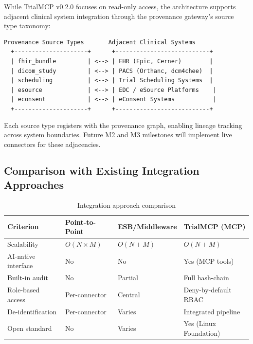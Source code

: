\documentclass[10pt,letterpaper]{article}
\begin{document}
While TrialMCP v0.2.0 focuses on read-only access, the architecture supports adjacent clinical system integration through the provenance gateway's source type taxonomy:

\begin{lstlisting}[title={\textbf{Clinical System Adjacency Model}}]
  Provenance Source Types       Adjacent Clinical Systems
  +---------------------+      +---------------------------+
  | fhir_bundle         | <--> | EHR (Epic, Cerner)        |
  | dicom_study         | <--> | PACS (Orthanc, dcm4chee)  |
  | scheduling          | <--> | Trial Scheduling Systems  |
  | esource             | <--> | EDC / eSource Platforms    |
  | econsent            | <--> | eConsent Systems           |
  +---------------------+      +---------------------------+
\end{lstlisting}

Each source type registers with the provenance graph, enabling lineage tracking across system boundaries. Future M2 and M3 milestones will implement live connectors for these adjacencies.

\subsection{Comparison with Existing Integration Approaches}

\begin{table}[H]
\centering
\caption{Integration approach comparison}
\label{tab:comparison}
\small
\begin{tabularx}{\textwidth}{l X X X}
\toprule
\textbf{Criterion} & \textbf{Point-to-Point} & \textbf{ESB/Middleware} & \textbf{TrialMCP (MCP)} \\
\midrule
Scalability & $O(N \times M)$ & $O(N + M)$ & $O(N + M)$ \\
AI-native interface & No & No & Yes (MCP tools) \\
Built-in audit & No & Partial & Full hash-chain \\
Role-based access & Per-connector & Central & Deny-by-default RBAC \\
De-identification & Per-connector & Varies & Integrated pipeline \\
Open standard & No & Varies & Yes (Linux Foundation) \\
\bottomrule
\end{tabularx}
\end{table}

\end{document}
